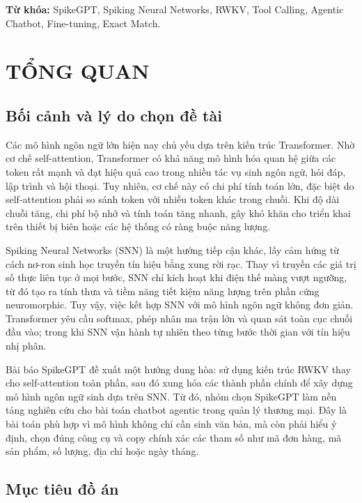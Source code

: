 \documentclass[12pt,a4paper,oneside]{report}
\newlength{\manualparindent}
\newcommand{\manualindent}{\hspace*{\manualparindent}}
\begin{document}
\manualindent%
\textbf{Từ khóa:} SpikeGPT, Spiking Neural Networks, RWKV, Tool Calling, Agentic Chatbot, Fine-tuning, Exact Match.

\chapter{TỔNG QUAN}

\section{Bối cảnh và lý do chọn đề tài}

\manualindent%
Các mô hình ngôn ngữ lớn hiện nay chủ yếu dựa trên kiến trúc Transformer. Nhờ cơ chế self-attention, Transformer có khả năng mô hình hóa quan hệ giữa các token rất mạnh và đạt hiệu quả cao trong nhiều tác vụ sinh ngôn ngữ, hỏi đáp, lập trình và hội thoại. Tuy nhiên, cơ chế này có chi phí tính toán lớn, đặc biệt do self-attention phải so sánh token với nhiều token khác trong chuỗi. Khi độ dài chuỗi tăng, chi phí bộ nhớ và tính toán tăng nhanh, gây khó khăn cho triển khai trên thiết bị biên hoặc các hệ thống có ràng buộc năng lượng.

\manualindent%
Spiking Neural Networks (SNN) là một hướng tiếp cận khác, lấy cảm hứng từ cách nơ-ron sinh học truyền tín hiệu bằng xung rời rạc. Thay vì truyền các giá trị số thực liên tục ở mọi bước, SNN chỉ kích hoạt khi điện thế màng vượt ngưỡng, từ đó tạo ra tính thưa và tiềm năng tiết kiệm năng lượng trên phần cứng neuromorphic. Tuy vậy, việc kết hợp SNN với mô hình ngôn ngữ không đơn giản. Transformer yêu cầu softmax, phép nhân ma trận lớn và quan sát toàn cục chuỗi đầu vào; trong khi SNN vận hành tự nhiên theo từng bước thời gian với tín hiệu nhị phân.

\manualindent%
Bài báo SpikeGPT đề xuất một hướng dung hòa: sử dụng kiến trúc RWKV thay cho self-attention toàn phần, sau đó xung hóa các thành phần chính để xây dựng mô hình ngôn ngữ sinh dựa trên SNN. Từ đó, nhóm chọn SpikeGPT làm nền tảng nghiên cứu cho bài toán chatbot agentic trong quản lý thương mại. Đây là bài toán phù hợp vì mô hình không chỉ cần sinh văn bản, mà còn phải hiểu ý định, chọn đúng công cụ và copy chính xác các tham số như mã đơn hàng, mã sản phẩm, số lượng, địa chỉ hoặc ngày tháng.

\section{Mục tiêu đồ án}
\end{document}
